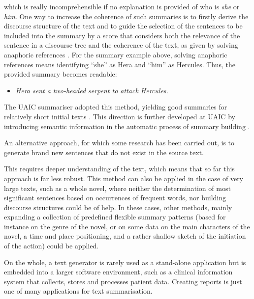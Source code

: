 \begin{multicols}{2}
\noindent
which is really incomprehensible if no explanation is provided of who is \textit{she} or \textit{him}.
One way to increase the coherence of such summaries is to firstly derive the discourse structure of the text and to guide the selection of the sentences to be included into the summary by a score that considers both the relevance of the sentence in a discourse tree and the coherence of the text, as given by solving anaphoric references \cite{cristea1}. For the summary example above, solving anaphoric references means identifying “she” as Hera and “him” as Hercules. Thus, the provided summary becomes readable:

\begin{itemize}
\item \textit{Hera sent a two-headed serpent to attack Hercules.}
\end{itemize}

The UAIC summariser adopted this method, yielding good summaries for relatively short initial texts \cite{cristea2}. This direction is further developed at UAIC by introducing semantic information in the automatic process of summary building \cite{trandabatRez}.

An alternative approach, for which some research has been carried out, is to generate brand new sentences that do not exist in the source text.


This requires deeper understanding of the text, which means that so far this approach is far less robust. This method can also be applied in the case of very large texts, such as a whole novel, where neither the determination of most significant sentences based on occurrences of frequent words, nor building discourse structures could be of help. In these cases, other methods, mainly expanding a collection of predefined flexible summary patterns (based for instance on the genre of the novel, or on some data on the main characters of the novel, a time and place positioning, and a rather shallow sketch of the initiation of the action) could be applied. 

On the whole, a text generator is rarely used as a stand-alone application but is embedded into a larger software environment, such as a clinical information system that collects, stores and processes patient data. Creating reports is just one of many applications for text summarisation. 


\end{multicols}
